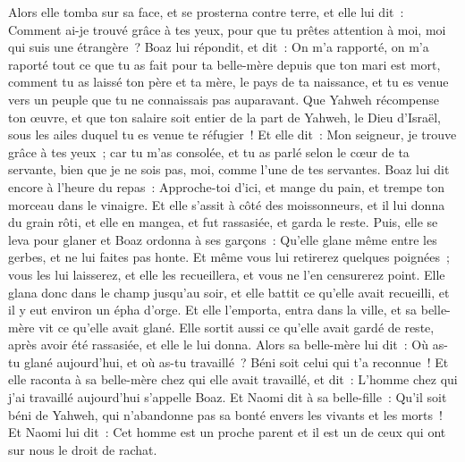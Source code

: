 \begin{multicols}{2}
Alors elle tomba sur sa face, et se prosterna contre terre, et elle lui dit~: Comment ai-je trouvé grâce à tes yeux, pour que tu prêtes attention à moi, moi qui suis une étrangère~?
Boaz lui répondit, et dit~: On m'a rapporté, on m'a raporté tout ce que tu as fait pour ta belle-mère depuis que ton mari est mort, comment tu as laissé ton père et ta mère, le pays de ta naissance, et tu es venue vers un peuple que tu ne connaissais pas auparavant.
Que Yahweh récompense ton œuvre, et que ton salaire soit entier de la part de Yahweh, le Dieu d'Israël, sous les ailes duquel tu es venue te réfugier~!
Et elle dit~: Mon seigneur, je trouve grâce à tes yeux~; car tu m'as consolée, et tu as parlé selon le cœur de ta servante, bien que je ne sois pas, moi, comme l'une de tes servantes.
Boaz lui dit encore à l'heure du repas~: Approche-toi d'ici, et mange du pain, et trempe ton morceau dans le vinaigre. Et elle s'assit à côté des moissonneurs, et il lui donna du grain rôti, et elle en mangea, et fut rassasiée, et garda le reste.
Puis, elle se leva pour glaner et Boaz ordonna à ses garçons~: Qu'elle glane même entre les gerbes, et ne lui faites pas honte.
Et même vous lui retirerez quelques poignées~; vous les lui laisserez, et elle les recueillera, et vous ne l'en censurerez point.
Elle glana donc dans le champ jusqu'au soir, et elle battit ce qu'elle avait recueilli, et il y eut environ un épha d'orge.
Et elle l'emporta, entra dans la ville, et sa belle-mère vit ce qu'elle avait glané. Elle sortit aussi ce qu'elle avait gardé de reste, après avoir été rassasiée, et elle le lui donna.
Alors sa belle-mère lui dit~: Où as-tu glané aujourd'hui, et où as-tu travaillé~? Béni soit celui qui t'a reconnue~! Et elle raconta à sa belle-mère chez qui elle avait travaillé, et dit~: L'homme chez qui j'ai travaillé aujourd'hui s'appelle Boaz.
Et Naomi dit à sa belle-fille~: Qu'il soit béni de Yahweh, qui n'abandonne pas sa bonté envers les vivants et les morts~! Et Naomi lui dit~: Cet homme est un proche parent et il est un de ceux qui ont sur nous le droit de rachat.

\end{multicols}
